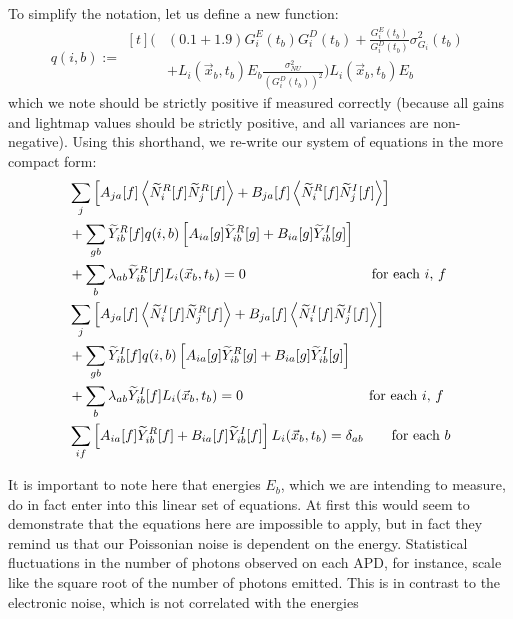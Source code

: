 To simplify the notation, let us define a new function:
\begin{equation} \label{eqn:DefinitionOfQ}
q(i,b) := \begin{aligned}[t]
  \bigg( &(0.1 + 1.9) G^E_i(t_b) G^D_i(t_b) + \frac{G^E_i(t_b)}{G^D_i(t_b)} \sigma^2_{G_i}(t_b)\\
  &+ L_i(\vec{x}_b,t_b) E_b \frac{\sigma^2_{NU}}{\left(G^D_i(t_b)\right)^2}\bigg)L_i(\vec{x}_b, t_b) E_b
\end{aligned}
\end{equation}
which we note should be strictly positive if measured correctly (because all gains and lightmap values should be strictly positive, and all variances are non-negative).  Using this shorthand, we re-write our system of equations in the more compact form:
\begin{subequations} \label{eqn:SystemToSolve} \begin{align}
&\sum_j \left[ A_{ja}[f] \left<\widetilde{N}_i^R[f]\widetilde{N}_j^R[f]\right> + B_{ja}[f] \left<\widetilde{N}_i^R[f]\widetilde{N}_j^I[f]\right>\right] \notag \\
&+ \sum_{gb} \widetilde{Y}_{ib}^R[f] q(i,b) \left[A_{ia}[g] \widetilde{Y}_{ib}^R[g] + B_{ia}[g] \widetilde{Y}_{ib}^I[g]\right] \notag \\
&+ \sum_b \lambda_{ab} \widetilde{Y}^R_{ib}[f] L_i(\vec{x}_b,t_b) = 0 \qquad \qquad \qquad \qquad \quad \text{for each $i$, $f$}\\
%
&\sum_j \left[ A_{ja}[f] \left<\widetilde{N}_i^I[f]\widetilde{N}_j^R[f]\right> + B_{ja}[f] \left<\widetilde{N}_i^I[f]\widetilde{N}_j^I[f]\right>\right] \notag \\
&+ \sum_{gb} \widetilde{Y}_{ib}^I[f] q(i,b) \left[A_{ia}[g] \widetilde{Y}_{ib}^R[g] + B_{ia}[g] \widetilde{Y}_{ib}^I[g]\right] \notag \\
&+ \sum_b \lambda_{ab} \widetilde{Y}^I_{ib}[f] L_i(\vec{x}_b,t_b) = 0 \qquad \qquad \qquad \qquad \quad \text{for each $i$, $f$}\\
%
&\sum_{if}\left[A_{ia}[f] \widetilde{Y}_{ib}^R[f] + B_{ia}[f] \widetilde{Y}_{ib}^I[f]\right] L_i(\vec{x}_b,t_b) = \delta_{ab} \qquad \text{for each $b$}
\end{align} \end{subequations}

It is important to note here that energies $E_b$, which we are intending to measure, do in fact enter into this linear set of equations.  At first this would seem to demonstrate that the equations here are impossible to apply, but in fact they remind us that our Poissonian noise is dependent on the energy.  Statistical fluctuations in the number of photons observed on each APD, for instance, scale like the square root of the number of photons emitted.  This is in contrast to the electronic noise, which is not correlated with the energies

